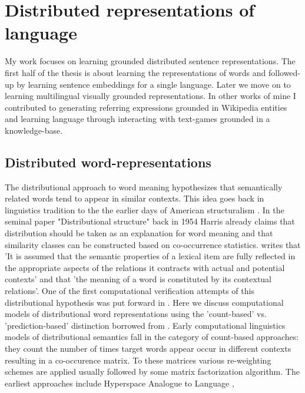 \section{Distributed representations of language}
My work focuses on learning grounded distributed sentence representations.
The first half of the thesis is about learning the representations of words and followed-up by learning sentence embeddings for a single language. Later we move on to learning multilingual visually grounded representations. In other works of mine I contributed to generating referring expressions grounded in Wikipedia entities and learning language through interacting with text-games grounded in a knowledge-base.

\subsection{Distributed word-representations}
The distributional approach to word meaning hypothesizes that semantically related words
tend to appear in similar contexts. This idea goes back in linguistics tradition to the the
earlier days of American structuralism \cite{nevin2002legacy}. In the seminal paper
"Distributional structure" \cite{harris1954distributional} back in 1954 Harris already claims
that distribution should be taken as an explanation for word meaning and that similarity classes
can be constructed based on co-occurrence statistics.
\cite{cruse1986lexical} writes that 'It is  assumed  that  the  semantic properties  of
a lexical  item  are  fully  reflected  in  the  appropriate  aspects  of  the  relations
it  contracts  with  actual  and  potential  contexts' and that 'the  meaning  of  a word
is constituted  by  its  contextual  relations'. One of the first computational verification
attempts of  this distributional hypothesis was put forward in \cite{miller1991contextual} .
Here we discuss computational models of distributional word representations using the 'count-based' vs.
'prediction-based' distinction borrowed from \cite{baroni2014don}.
Early computational linguistics models of distributional semantics fall in the category of count-based approaches:
they count the number of times target words appear occur in different contexts resulting in a co-occurence matrix.
To these matrices various re-weighting schemes are applied usually followed by some matrix factorization algorithm.
The earliest approaches include Hyperspace Analogue to Language \cite{lund1996producing},
